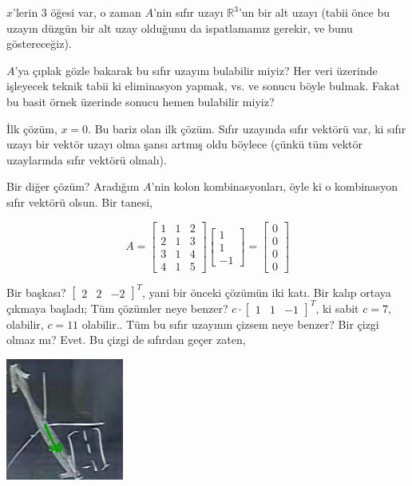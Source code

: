 \documentclass[12pt,fleqn]{article}\usepackage{../../common}
\begin{document}
$x$'lerin 3 öğesi var, o zaman $A$'nin sıfır uzayı $\mathbb{R}^3$'un bir
alt uzayı (tabii önce bu uzayın düzgün bir alt uzay olduğunu da
ispatlamamız gerekir, ve bunu göstereceğiz). 

$A$'ya çıplak gözle bakarak bu sıfır uzayını bulabilir miyiz? Her veri
üzerinde işleyecek teknik tabii ki eliminasyon yapmak, vs. ve sonucu böyle
bulmak. Fakat bu basit örnek üzerinde sonucu hemen bulabilir miyiz? 

İlk çözüm, $x=0$. Bu bariz olan ilk çözüm. Sıfır uzayında sıfır vektörü
var, ki sıfır uzayı bir vektör uzayı olma şansı artmış oldu böylece (çünkü
tüm vektör uzaylarında sıfır vektörü olmalı). 

Bir diğer çözüm? Aradığım $A$'nin kolon kombinasyonları, öyle ki o
kombinasyon sıfır vektörü olsun. Bir tanesi,

$$ A = 
\left[\begin{array}{rrr}
1 & 1 & 2 \\
2 & 1 & 3 \\
3 & 1 & 4 \\
4 & 1 & 5 
\end{array}\right]
\left[\begin{array}{r}
1  \\
1  \\
-1  
\end{array}\right] 
=
\left[\begin{array}{r}
0  \\
0  \\
0  \\
0  
\end{array}\right]
$$

Bir başkası? $\left[\begin{array}{rrr}2 & 2 & -2\end{array}\right]^T$,
yani bir önceki çözümün iki katı. Bir kalıp ortaya çıkmaya başladı; Tüm
çözümler neye benzer? $c \cdot \left[\begin{array}{rrr}1 & 1 &
-1\end{array}\right]^T$, ki sabit $c=7$, olabilir, $c=11$
olabilir.. Tüm bu sıfır uzayının çizsem neye benzer? Bir çizgi olmaz mı?
Evet. Bu çizgi de sıfırdan geçer zaten,

\includegraphics[height=4cm]{6_02.png}
\end{document}
